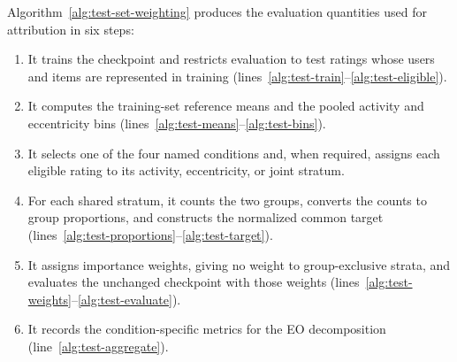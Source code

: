 \documentclass[11pt]{article}
\begin{document}
Algorithm~\ref{alg:test-set-weighting} produces the evaluation quantities used
for attribution in six steps:
\begin{enumerate}
    \item It trains the checkpoint and restricts evaluation to test ratings
    whose users and items are represented in training
    (lines~\ref{alg:test-train}--\ref{alg:test-eligible}).
    \item It computes the training-set reference means and the pooled
    activity and eccentricity bins (lines~\ref{alg:test-means}--\ref{alg:test-bins}).
    \item It selects one of the four named conditions and, when required,
    assigns each eligible rating to its activity, eccentricity, or joint
    stratum.
    \item For each shared stratum, it counts the two groups, converts the
    counts to group proportions, and constructs the normalized common target
    (lines~\ref{alg:test-proportions}--\ref{alg:test-target}).
    \item It assigns importance weights, giving no weight to group-exclusive
    strata, and evaluates the unchanged checkpoint with those weights
    (lines~\ref{alg:test-weights}--\ref{alg:test-evaluate}).
    \item It records the condition-specific metrics for the EO decomposition
    (line~\ref{alg:test-aggregate}).
\end{enumerate}
\end{document}
